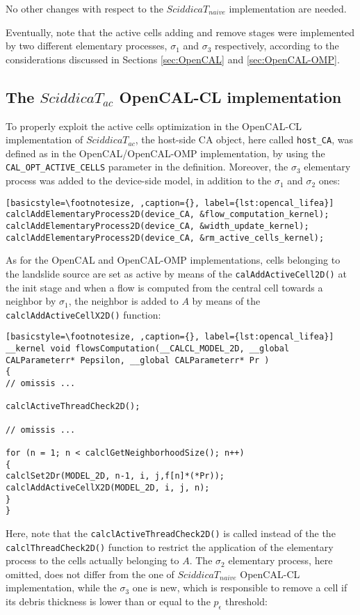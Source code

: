 \noindent No other changes with respect to the $SciddicaT_{naive}$
implementation are needed.

Eventually, note that the active cells adding and remove stages
were implemented by two different elementary processes, $\sigma_1$
and $\sigma_3$ respectively, according to the considerations
discussed in Sections \ref{sec:OpenCAL} and \ref{sec:OpenCAL-OMP}.

\subsection{The $SciddicaT_{ac}$ OpenCAL-CL implementation}
To properly exploit the active cells optimization in the
OpenCAL-CL implementation of $SciddicaT_{ac}$, the host-side CA
object, here called \verb'host_CA', was defined as in the
OpenCAL/OpenCAL-OMP implementation, by using the
\verb'CAL_OPT_ACTIVE_CELLS' parameter in the definition. Moreover,
the $\sigma_3$ elementary process was added to the device-side
model, in addition to the $\sigma_1$ and $\sigma_2$ ones:

\begin{lstlisting}[basicstyle=\footnotesize, ,caption={}, label={lst:opencal_lifea}]
calclAddElementaryProcess2D(device_CA, &flow_computation_kernel);
calclAddElementaryProcess2D(device_CA, &width_update_kernel);
calclAddElementaryProcess2D(device_CA, &rm_active_cells_kernel);
\end{lstlisting}

\noindent As for the OpenCAL and OpenCAL-OMP implementations,
cells belonging to the landslide source are set as active by means
of the \verb'calAddActiveCell2D()' at the init stage and when a
flow is computed from the central cell towards a neighbor by
$\sigma_1$, the neighbor is added to $A$ by means of the
\verb'calclAddActiveCellX2D()' function:

\begin{lstlisting}[basicstyle=\footnotesize, ,caption={}, label={lst:opencal_lifea}]
__kernel void flowsComputation(__CALCL_MODEL_2D, __global CALParameterr* Pepsilon, __global CALParameterr* Pr )
{
// omissis ...

calclActiveThreadCheck2D();

// omissis ...

for (n = 1; n < calclGetNeighborhoodSize(); n++)
{
calclSet2Dr(MODEL_2D, n-1, i, j,f[n]*(*Pr));
calclAddActiveCellX2D(MODEL_2D, i, j, n);
}
}
\end{lstlisting}

\noindent Here, note that the \verb'calclActiveThreadCheck2D()' is
called instead of the the \verb'calclThreadCheck2D()' function to
restrict the application of the elementary process to the cells
actually belonging to $A$. The $\sigma_2$ elementary process, here
omitted, does not differ from the one of $SciddicaT_{naive}$
OpenCAL-CL implementation, while the $\sigma_3$ one is new, which
is responsible to remove a cell if its debris thickness is lower
than or equal to the $p_\epsilon$ threshold:

